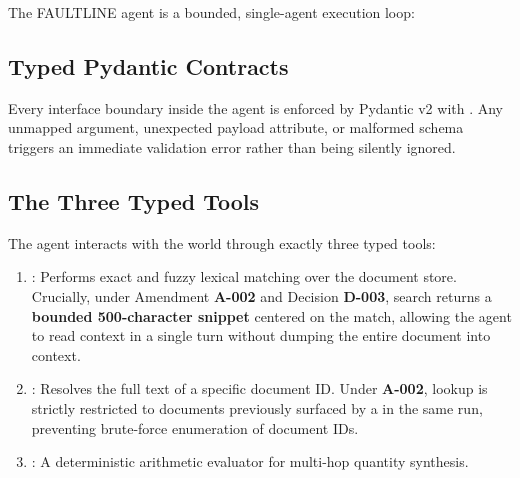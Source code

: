 The FAULTLINE agent is a bounded, single-agent execution loop:
\begin{center}
\end{center}

\subsection{Typed Pydantic Contracts}
Every interface boundary inside the agent is enforced by Pydantic v2 with . Any unmapped argument, unexpected payload attribute, or malformed schema triggers an immediate validation error rather than being silently ignored.

\subsection{The Three Typed Tools}
The agent interacts with the world through exactly three typed tools:
\begin{enumerate}
    \item {}: Performs exact and fuzzy lexical matching over the document store. Crucially, under Amendment \textbf{A-002} and Decision \textbf{D-003}, search returns a \textbf{bounded 500-character snippet} centered on the match, allowing the agent to read context in a single turn without dumping the entire document into context.
    \item {}: Resolves the full text of a specific document ID. Under \textbf{A-002}, lookup is strictly restricted to documents previously surfaced by a  in the same run, preventing brute-force enumeration of document IDs.
    \item {}: A deterministic arithmetic evaluator for multi-hop quantity synthesis.
\end{enumerate}

